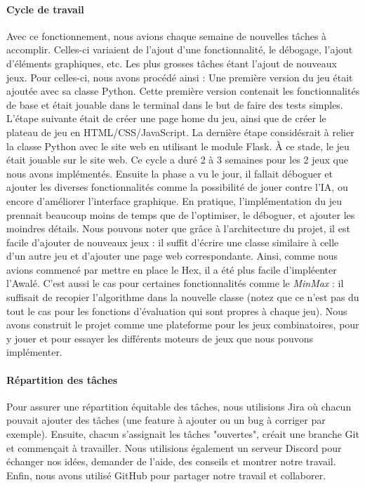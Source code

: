 \paragraph{Cycle de travail}
Avec ce fonctionnement, nous avions chaque semaine de nouvelles tâches à accomplir. Celles-ci variaient de l'ajout d'une fonctionnalité, le débogage, l'ajout d'éléments graphiques, etc.
Les plus grosses tâches étant l'ajout de nouveaux jeux. Pour celles-ci, nous avons procédé ainsi :
Une première version du jeu était ajoutée avec sa classe Python. Cette première version contenait les fonctionnalités de base et était jouable dans le terminal dans le but de faire des tests simples. 
L'étape suivante était de créer une page home du jeu, ainsi que de créer le plateau de jeu en HTML/CSS/JavaScript. La dernière étape considésrait à relier la classe 
Python avec le site web en utilisant le module Flask.
À ce stade, le jeu était jouable sur le site web. Ce cycle a duré 2 à 3 semaines pour les 2 jeux que nous avons implémentés. Ensuite la phase a vu le jour, il fallait déboguer et ajouter les 
diverses fonctionnalités comme la possibilité de jouer contre l'IA, ou encore d'améliorer l'interface graphique. En pratique, l'implémentation du jeu prennait beaucoup moins de temps que de l'optimiser, 
le déboguer, et ajouter les moindres détails.
Nous pouvons noter que grâce à l'architecture du projet, il est facile d'ajouter de nouveaux jeux : il suffit d'écrire une classe similaire à celle d'un autre jeu et d'ajouter une 
page web correspondante. Ainsi, comme nous avions commencé par mettre en place le Hex, il a été plus facile d'impléenter l'Awalé.
C'est aussi le cas pour certaines fonctionnalités comme le \emph{MinMax} : il suffisait de recopier l'algorithme dans la nouvelle classe (notez que ce n'est pas du 
tout le cas pour les fonctions d'évaluation qui sont propres à chaque jeu).
Nous avons construit le projet comme une plateforme pour les jeux combinatoires, pour y jouer et pour essayer les différents moteurs de jeux que nous pouvons implémenter.

\paragraph{Répartition des tâches}
Pour assurer une répartition équitable des tâches, nous utilisions Jira où chacun pouvait ajouter des tâches (une feature à ajouter ou un bug à corriger par exemple). 
Ensuite, chacun s'assignait les tâches "ouvertes", créait une branche Git et commençait à travailler. Nous utilisions également un serveur Discord pour échanger 
nos idées, demander de l'aide, des conseils et montrer notre travail. Enfin, nous avons utilisé GitHub pour partager notre travail et collaborer.



